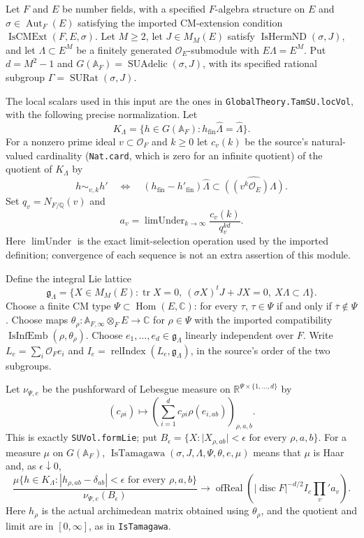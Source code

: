 \begin{definition}
Let $F$ and $E$ be number fields, with a specified $F$-algebra structure
on $E$ and $\sigma\in\operatorname{Aut}_F(E)$ satisfying the imported
CM-extension condition $\operatorname{IsCMExt}(F,E,\sigma)$.
Let $M\ge2$, let $J\in M_M(E)$ satisfy
$\operatorname{IsHermND}(\sigma,J)$, and let
$\Lambda\subset E^M$ be a finitely generated $\mathcal O_E$-submodule
with $E\Lambda=E^M$. Put $d=M^2-1$ and
$G(\mathbb A_F)=\operatorname{SUAdelic}(\sigma,J)$, with its specified
rational subgroup $\Gamma=\operatorname{SURat}(\sigma,J)$.

The local scalars used in this input are the ones in
\texttt{GlobalTheory.TamSU.locVol}, with the following precise
normalization. Let
\[
 K_\Lambda=\{h\in G(\mathbb A_F):
                 h_{\mathrm{fin}}\widehat\Lambda=\widehat\Lambda\}.
\]
For a nonzero prime ideal $v\subset\mathcal O_F$ and $k\ge0$ let
$c_v(k)$ be the source's natural-valued cardinality (\texttt{Nat.card},
which is zero for an infinite quotient) of the quotient of $K_\Lambda$ by
\[
 h\sim_{v,k}h'
 \quad\Longleftrightarrow\quad
 (h_{\mathrm{fin}}-h'_{\mathrm{fin}})\widehat\Lambda
       \subset\widehat{((v^k\mathcal O_E)\Lambda)}.
\]
Set $q_v=N_{F/\mathbb Q}(v)$ and
\[
 a_v=\operatorname{limUnder}_{k\to\infty}
                         \frac{c_v(k)}{q_v^{kd}} .
\]
Here $\operatorname{limUnder}$ is the exact limit-selection operation
used by the imported definition; convergence of each sequence is not
an extra assertion of this module.

Define the integral Lie lattice
\[
 \mathfrak g_\Lambda=
 \{X\in M_M(E):\operatorname{tr}X=0,\ 
        (\sigma X)^tJ+JX=0,\ X\Lambda\subset\Lambda\}.
\]
Choose a finite CM type $\Psi\subset\operatorname{Hom}(E,\mathbb C)$:
for every $\tau$, $\tau\in\Psi$ if and only if
$\overline\tau\notin\Psi$.
Choose maps
$\theta_\rho:\mathbb A_{F,\infty}\otimes_F E\to\mathbb C$
for $\rho\in\Psi$ with the imported compatibility
$\operatorname{IsInfEmb}(\rho,\theta_\rho)$.
Choose $e_1,\ldots,e_d\in\mathfrak g_\Lambda$ linearly independent
over $F$. Write $L_e=\sum_i\mathcal O_F e_i$ and
$I_e=\operatorname{relIndex}(L_e,\mathfrak g_\Lambda)$,
in the source's order of the two subgroups.

Let $\nu_{\Psi,e}$ be the pushforward of Lebesgue measure on
$\mathbb R^{\Psi\times\{1,\ldots,d\}}$ by
\[
 (c_{\rho i})\longmapsto
       \left(\sum_{i=1}^d c_{\rho i}\rho(e_{i,ab})\right)_{\rho,a,b}.
\]
This is exactly \texttt{SUVol.formLie}; put
$B_\epsilon=\{X:\lvert X_{\rho,ab}\rvert<\epsilon
\text{ for every }\rho,a,b\}$.
For a measure $\mu$ on $G(\mathbb A_F)$,
$\operatorname{IsTamagawa}(\sigma,J,\Lambda,\Psi,\theta,e,\mu)$
means that $\mu$ is Haar and, as $\epsilon\downarrow0$,
\[
 \frac{\mu\{h\in K_\Lambda:
       |h_{\rho,ab}-\delta_{ab}|<\epsilon
                  \text{ for every }\rho,a,b\}}
      {\nu_{\Psi,e}(B_\epsilon)}
 \longrightarrow
 \operatorname{ofReal}\left(
     |\operatorname{disc}F|^{-d/2} I_e\prod_v' a_v\right).
\]
Here $h_\rho$ is the actual archimedean matrix obtained using
$\theta_\rho$, and the quotient and limit are in $[0,\infty]$,
as in \texttt{IsTamagawa}.


\end{definition}
